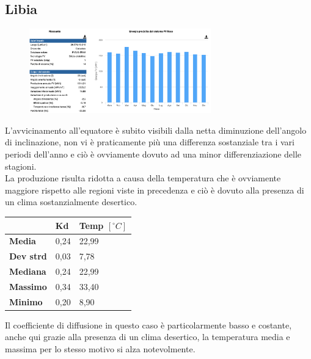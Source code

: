 \subsection{Libia}
\begin{figure}[H]
    \centering
    \includegraphics[width=0.7\textwidth]{res/cap 5/impianto libia}
\end{figure}\noindent
L'avvicinamento all'equatore è subito visibili dalla netta diminuzione dell'angolo di inclinazione, non vi è praticamente più una differenza sostanziale tra i vari periodi dell'anno e ciò è ovviamente dovuto ad una minor differenziazione delle stagioni.\\
La produzione risulta ridotta a causa della temperatura che è ovviamente maggiore rispetto alle regioni viste in precedenza e ciò è dovuto alla presenza di un clima sostanzialmente desertico.
\begin{table}[H]
    \centering
    \begin{tabular}{|l|l|l|}
    \hline
          & \textbf{Kd} & \textbf{Temp $[{}^\circ C]$} \\ \hline
        \textbf{Media} & 0,24 & 22,99 \\ \hline
        \textbf{Dev strd} & 0,03 & 7,78 \\ \hline
        \textbf{Mediana} & 0,24 & 22,99 \\ \hline
        \textbf{Massimo} & 0,34 & 33,40 \\ \hline
        \textbf{Minimo} & 0,20 & 8,90 \\ \hline
    \end{tabular}
\end{table}
Il coefficiente di diffusione in questo caso è particolarmente basso e costante, anche qui grazie alla presenza di un clima desertico, la temperatura media e massima per lo stesso motivo si alza notevolmente.
\vfill\newpage
